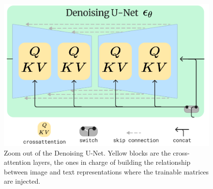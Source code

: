 \begin{figure}[H] 
\centering
\includegraphics[width=\columnwidth]{main/content/images/diagrams/lora.png}
\caption{Zoom out of the Denoising U-Net. Yellow blocks are the cross-attention layers, the ones in charge of building the relationship between image and text representations where the trainable matrices are injected.}
\label{fig:lora_sd_diagram}
\end{figure}